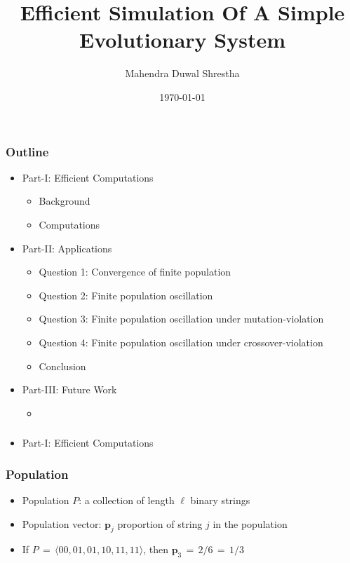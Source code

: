 \documentclass[aspectratio=169]{beamer}
\title{Efficient Simulation Of A Simple Evolutionary System}
\author{Mahendra Duwal Shrestha}
\institute{The University Of Tenessee}
\date{\today}
\begin{document}
  \begin{frame}
    \titlepage
  \end{frame}

  \begin{frame}
    \frametitle{Outline}
    \begin{itemize}
      \item Part-I: Efficient Computations
	\begin{itemize}
	  \item{Background}
	  \item{Computations}
	\end{itemize}
      \item Part-II: Applications
      \begin{itemize}
	\item{Question 1: Convergence of finite population}
	\item{Question 2: Finite population oscillation}
	\item{Question 3: Finite population oscillation under mutation-violation}
	\item{Question 4: Finite population oscillation under crossover-violation}
	\item{Conclusion}
      \end{itemize}
      
      \item Part-III: Future Work 
      \begin{itemize}
	\item{}
      \end{itemize}
    \end{itemize}
  \end{frame}
  
  \begin{frame}
    \frametitle{}
    \begin{itemize}
      \item Part-I: Efficient Computations
      \end{itemize}
    \end{frame}
  
  \begin{frame}
    \frametitle{Population}
    \begin{itemize}
      \item{Population $P$: a collection of length $\ell$ binary strings}
      \item{Population vector: $\bm{p}_j$ proportion of string $j$ in the population}
      \item{If $P \,=\, \langle 00, 01, 01, 10, 11, 11 \rangle$, then $\bm{p}_3 \,=\, 2/6 \,=\, 1/3$}
      \vspace{0.1in}%
    \end{itemize}
  \end{frame}
  
\end{document}

